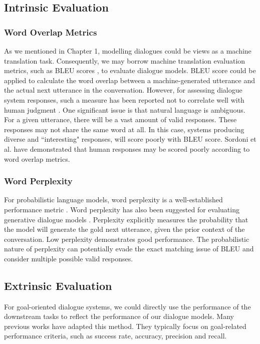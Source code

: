 \documentclass[bsc,frontabs,twoside,singlespacing,parskip,deptreport]{infthesis}     %
\begin{document}
\subsection{Intrinsic Evaluation}

\subsubsection*{Word Overlap Metrics}

As we mentioned in Chapter 1, modelling dialogues could be views as a machine translation task. Consequently, we may borrow machine translation evaluation metrics, such as BLEU scores \cite{papineni2002bleu}, to evaluate dialogue models. BLEU score could be applied to calculate the word overlap between a machine-generated utterance and the actual next utterance in the conversation. However, for assessing dialogue system responses, such a measure has been reported not to correlate well with human judgment \cite{liu2016not}. One significant issue is that natural language is ambiguous. For a given utterance, there will be a vast amount of valid responses. These responses may not share the same word at all. In this case, systems producing diverse and ``interesting" responses, will score poorly with BLEU score. Sordoni et al. \cite{sordoni2015neural} have demonstrated that human responses may be scored poorly according to word overlap metrics.

\subsubsection*{Word Perplexity}

For probabilistic language models, word perplexity is a well-established performance metric \cite{bengio2003neural,mikolov2010recurrent}. Word perplexity has also been suggested for evaluating generative dialogue models \cite{pietquin2013survey}. Perplexity explicitly measures the probability that the model will generate the gold next utterance, given the prior context of the conversation. Low perplexity demonstrates good performance. The probabilistic nature of perplexity can potentially evade the exact matching issue of BLEU and consider multiple possible valid responses.

\subsection{Extrinsic Evaluation}

For goal-oriented dialogue systems, we could directly use the performance of the downstream tasks to reflect the performance of our dialogue models. Many previous works \cite{strub2017end,shekhar2017foil,reddy2019coqa,zhou2018dataset,de2017guesswhat,das2017visual,das2017learning} have adapted this method. They typically focus on goal-related performance criteria, such as success rate, accuracy, precision and recall.
\end{document}
